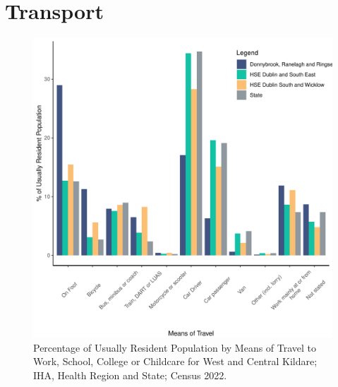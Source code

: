 \documentclass{article}
\begin{document}
\section{Transport}\label{sect:Trans}
\begin{figure}[H]
	\centering
	\includegraphics[width = 120mm]{../figures/TravelED.pdf}
	\caption{Percentage of Usually Resident Population by Means of Travel to Work, School, College or Childcare for West and Central Kildare; IHA, Health Region and State; Census 2022.}
	\label{fig:vbnv}
	\end{figure}
\end{document}
